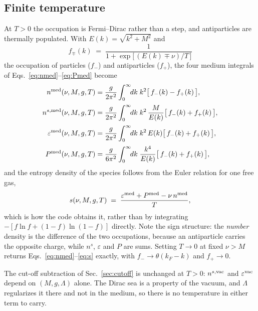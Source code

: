 \documentclass[aps,prc,onecolumn,superscriptaddress,nofootinbib,10pt]{revtex4-2}
\newcommand{\kF}{k_F}
\begin{document}
\subsection{Finite temperature}
\label{sec:kineticT}

At $T > 0$ the occupation is Fermi--Dirac rather than a step, and
antiparticles are thermally populated. With $E(k) = \sqrt{k^2 + M^2}$ and
%
\begin{equation}
f_{\mp}(k) \;=\; \frac{1}{1 + \exp\!\big[\,(E(k) \mp \nu)/T\,\big]}
\label{eq:fermidirac}
\end{equation}
%
the occupation of particles ($f_-$) and antiparticles ($f_+$), the four
medium integrals of Eqs.~\eqref{eq:nmed}--\eqref{eq:Pmed} become
%
\begin{align}
n^{\rm med}(\nu, M, g, T) &= \frac{g}{2\pi^2}\int_0^\infty\!\! dk\;k^2
   \big[\, f_-(k) - f_+(k) \,\big] ,
\label{eq:nmedT}\\[2pt]
n^{s,{\rm med}}(\nu, M, g, T) &= \frac{g}{2\pi^2}\int_0^\infty\!\! dk\;k^2\,
   \frac{M}{E(k)} \big[\, f_-(k) + f_+(k) \,\big] ,
\label{eq:nsmedT}\\[2pt]
\varepsilon^{\rm med}(\nu, M, g, T) &= \frac{g}{2\pi^2}\int_0^\infty\!\! dk\;
   k^2\, E(k) \big[\, f_-(k) + f_+(k) \,\big] ,
\label{eq:epsmedT}\\[2pt]
P^{\rm med}(\nu, M, g, T) &= \frac{g}{6\pi^2}\int_0^\infty\!\! dk\;
   \frac{k^4}{E(k)} \big[\, f_-(k) + f_+(k) \,\big] ,
\label{eq:PmedT}
\end{align}
%
and the entropy density of the species follows from the Euler relation for
one free gas,
%
\begin{equation}
s(\nu, M, g, T) \;=\;
  \frac{\varepsilon^{\rm med} + P^{\rm med} - \nu\, n^{\rm med}}{T} ,
\label{eq:sT}
\end{equation}
%
which is how the code obtains it, rather than by integrating
$-[f\ln f + (1-f)\ln(1-f)]$ directly. Note the sign structure: the
\emph{number} density is the difference of the two occupations, because an
antiparticle carries the opposite charge, while $n^s$, $\varepsilon$ and $P$
are sums. Setting $T \to 0$ at fixed $\nu > M$ returns
Eqs.~\eqref{eq:nmed}--\eqref{eq:s} exactly, with $f_- \to \theta(\kF - k)$ and
$f_+ \to 0$.

The cut-off subtraction of Sec.~\ref{sec:cutoff} is unchanged at $T > 0$:
$n^{s,{\rm vac}}$ and $\varepsilon^{\rm vac}$ depend on $(M, g, \Lambda)$
alone. The Dirac sea is a property of the vacuum, and $\Lambda$ regularizes it
there and not in the medium, so there is no temperature in either term to
carry.
\end{document}
